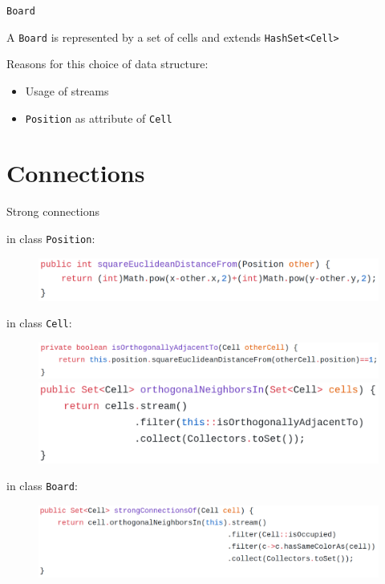 \documentclass{beamer}
\begin{document}
\begin{frame}{\texttt{Board}}

A \texttt{Board} is represented by a set of cells and extends \texttt{HashSet<Cell>} 

\vspace{0.5cm}
Reasons for this choice of data structure:
\begin{itemize}
    \item Usage of streams
    \item \texttt{Position} as attribute of \texttt{Cell}    
\end{itemize}


\end{frame}


\section{Connections}


\begin{frame}{Strong connections}


	in class \texttt{Position}:

	\begin{figure}
		\includegraphics[scale=0.15]{images/position.png}
	\end{figure}



	in class \texttt{Cell}:

	\begin{figure}
		\includegraphics[scale=0.15]{images/cell1.png}
		\includegraphics[scale=0.15]{images/cell2.png}
	\end{figure}

	
	in class \texttt{Board}:

	\begin{figure}
		\includegraphics[scale=0.15]{images/board1.png}
	\end{figure}


	
\end{frame}
\end{document}
